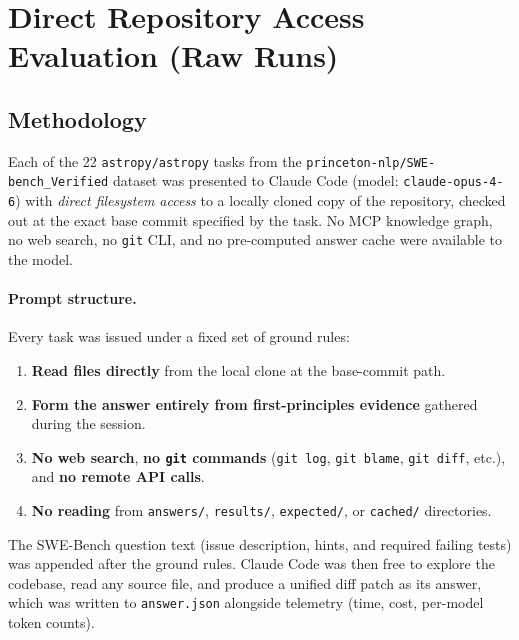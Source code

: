 
\section{Direct Repository Access Evaluation (Raw Runs)}\label{sec:raw}

\subsection{Methodology}

Each of the 22 \texttt{astropy/astropy} tasks from the
\texttt{princeton-nlp/SWE-bench\_Verified} dataset was presented to
Claude Code (model: \texttt{claude-opus-4-6}) with \emph{direct
filesystem access} to a locally cloned copy of the repository, checked
out at the exact base commit specified by the task.
No MCP knowledge graph, no web search, no \texttt{git} CLI, and no
pre-computed answer cache were available to the model.

\paragraph{Prompt structure.}
Every task was issued under a fixed set of ground rules:

\begin{enumerate}
  \item \textbf{Read files directly} from the local clone at the base-commit path.
  \item \textbf{Form the answer entirely from first-principles evidence}
        gathered during the session.
  \item \textbf{No web search}, \textbf{no \texttt{git} commands}
        (\texttt{git log}, \texttt{git blame}, \texttt{git diff}, etc.),
        and \textbf{no remote API calls}.
  \item \textbf{No reading} from \texttt{answers/}, \texttt{results/},
        \texttt{expected/}, or \texttt{cached/} directories.
\end{enumerate}

\noindent
The SWE-Bench question text (issue description, hints, and required
failing tests) was appended after the ground rules.
Claude Code was then free to explore the codebase, read any source file,
and produce a unified diff patch as its answer, which was written to
\texttt{answer.json} alongside telemetry (time, cost, per-model token
counts).

